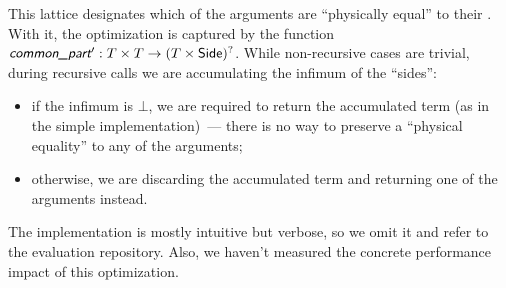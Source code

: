 This lattice designates which of the arguments are ``physically equal'' to their \commonpart. With it, the optimization is captured by the function $\commonpart' : T \times T \rightarrow (T \times \textsf{Side})^?$. While non-recursive cases are trivial, during recursive calls we are accumulating the infimum of the ``sides'':

\begin{itemize}
    \item if the infimum is $\bot$, we are required to return the accumulated term (as in the simple implementation)~--- there is no way to preserve a ``physical equality'' to any of the arguments;
    \item otherwise, we are discarding the accumulated term and returning one of the arguments instead.
\end{itemize}

The implementation is mostly intuitive but verbose, so we omit it and refer to the evaluation repository. Also, we haven't measured the concrete performance impact of this optimization.
